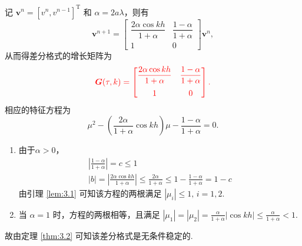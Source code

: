 \begin{instance}
    记 $\bm{v}^n = [v^n, v^{n-1}]^{\mathrm{T}}$ 和 $\alpha = 2a\lambda$，则有
    \begin{equation*}
        \bm{v}^{n+1} = \begin{bmatrix}
            \dfrac{2\alpha \cos kh}{1 + \alpha} & \dfrac{1 - \alpha}{1 + \alpha} \\[10pt]
            1 & 0
        \end{bmatrix} \bm{v}^n,
    \end{equation*}
    从而得差分格式的增长矩阵为
    \begin{equation*}
        {\color{red}
        \bm{G}(\tau, k) = \begin{bmatrix}
            \dfrac{2\alpha \cos kh}{1 + \alpha} & \dfrac{1 - \alpha}{1 + \alpha} \\[10pt]
            1 & 0
        \end{bmatrix}.
        }
    \end{equation*}
    \noindent{} 相应的特征方程为
    \begin{equation*}
        \mu^2 - \left(\frac{2\alpha}{1+\alpha} \cos kh \right) \mu - \frac{1-\alpha}{1+\alpha} = 0.
    \end{equation*}
    \begin{enumerate}[1)]
        \item 由于$\alpha>0$，
        \begin{gather*}
            \left|\frac{1-\alpha}{1+\alpha}\right|=c \leq 1\\
            |b|=\left|\frac{2\alpha\cos kh}{1+\alpha}\right|\leq \frac{2\alpha}{1+\alpha}\leq 1-\frac{1-\alpha}{1+\alpha}=1-c
        \end{gather*}
        由引理 \ref{lem:3.1} 可知该方程的两根满足 $|\mu_i| \leq 1, \, i = 1, 2$.
        \item 当 $\alpha = 1$ 时，方程的两根相等，且满足 $|\mu_1| = |\mu_2| = \frac{\alpha}{1+\alpha} |\cos kh| \leq \frac{\alpha}{1+\alpha} < 1$.
    \end{enumerate}
    故由定理 \ref{thm:3.2} 可知该差分格式是无条件稳定的.
\end{instance}

